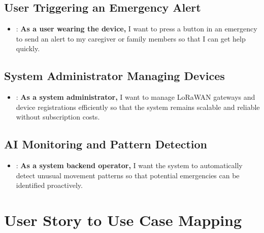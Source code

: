 \subsection{User Triggering an Emergency Alert}
\begin{itemize}
    \item {}: \textbf{As a user wearing the device,} I want to press a button in an emergency to send an alert to my caregiver or family members so that I can get help quickly.
\end{itemize}

\subsection{System Administrator Managing Devices}
\begin{itemize}
    \item {}: \textbf{As a system administrator,} I want to manage LoRaWAN gateways and device registrations efficiently so that the system remains scalable and reliable without subscription costs.
\end{itemize}

\subsection{AI Monitoring and Pattern Detection}
\begin{itemize}
    \item {}: \textbf{As a system backend operator,} I want the system to automatically detect unusual movement patterns so that potential emergencies can be identified proactively.
\end{itemize}

\section{User Story to Use Case Mapping}

